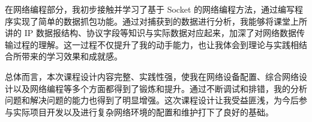 \documentclass[UTF8,12pt,a4paper]{ctexart}
\begin{document}
在网络编程部分，我初步接触并学习了基于 Socket 的网络编程方法，通过编写程序实现了简单的数据抓包功能。通过对捕获到的数据进行分析，我能够将课堂上所讲的 IP 数据报结构、协议字段等知识与实际数据对应起来，加深了对网络数据传输过程的理解。这一过程不仅提升了我的动手能力，也让我体会到理论与实践相结合所带来的学习效果和成就感。

总体而言，本次课程设计内容完整、实践性强，使我在网络设备配置、综合网络设计以及网络编程等多个方面都得到了锻炼和提升。通过不断调试和排错，我的分析问题和解决问题的能力也得到了明显增强。这次课程设计让我受益匪浅，为今后参与实际项目开发以及进行复杂网络环境的配置和维护打下了良好的基础。
\end{document}
